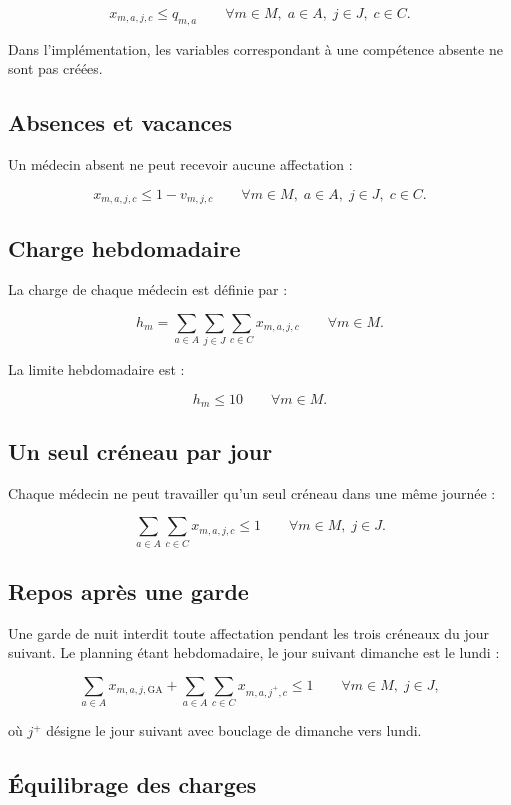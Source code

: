 \documentclass[11pt,a4paper]{article}
\begin{document}
\[
x_{m,a,j,c} \leq q_{m,a}
\qquad \forall m\in M,\;a\in A,\;j\in J,\;c\in C.
\]

Dans l'implémentation, les variables correspondant à une compétence absente
ne sont pas créées.

\subsection{Absences et vacances}

Un médecin absent ne peut recevoir aucune affectation :

\[
x_{m,a,j,c} \leq 1-v_{m,j,c}
\qquad \forall m\in M,\;a\in A,\;j\in J,\;c\in C.
\]

\subsection{Charge hebdomadaire}

La charge de chaque médecin est définie par :

\[
h_m = \sum_{a\in A}\sum_{j\in J}\sum_{c\in C}x_{m,a,j,c}
\qquad \forall m\in M.
\]

La limite hebdomadaire est :

\[
h_m \leq 10
\qquad \forall m\in M.
\]

\subsection{Un seul créneau par jour}

Chaque médecin ne peut travailler qu'un seul créneau dans une même journée :

\[
\sum_{a\in A}\sum_{c\in C}x_{m,a,j,c} \leq 1
\qquad \forall m\in M,\;j\in J.
\]

\subsection{Repos après une garde}

Une garde de nuit interdit toute affectation pendant les trois créneaux du
jour suivant. Le planning étant hebdomadaire, le jour suivant dimanche est
le lundi :

\[
\sum_{a\in A}x_{m,a,j,\mathrm{GA}}
+ \sum_{a\in A}\sum_{c\in C}x_{m,a,j^+,c}
\leq 1
\qquad \forall m\in M,\;j\in J,
\]

où $j^+$ désigne le jour suivant avec bouclage de dimanche vers lundi.

\subsection{Équilibrage des charges}
\end{document}
